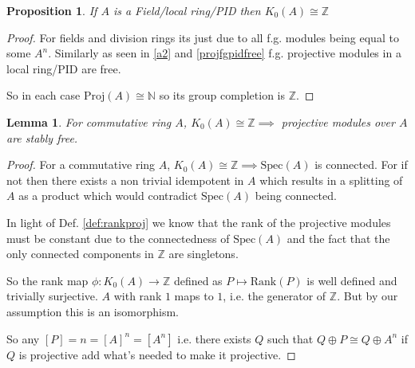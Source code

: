 \documentclass[12pt]{article}
\numberwithin{equation}{section}
\newcommand{\Z}{\mathbb{Z}}
\newcommand{\N}{\mathbb{N}}
\newcounter{dummy} \numberwithin{dummy}{section}
\newtheorem{definition}[dummy]{Definition}
\newtheorem{lemma}[dummy]{Lemma}
\newtheorem{proposition}[dummy]{Proposition}
\begin{document}
%	
	\begin{proposition}\label{k0pidisZ}
	If $A$ is a Field/local ring/PID then $K_0(A)\cong\Z$
	\end{proposition}
	\begin{proof}
		For fields and division rings its just due to all f.g. modules being equal to some $A^n$. Similarly as seen in \ref{a2} and \ref{projfgpidfree} f.g. projective modules in a local ring/PID are free.
		
		So in each case $\mathrm{Proj}(A) \cong \N$ so its group completion is $\Z.$
		\end{proof}
		
	\begin{lemma} For commutative ring $A$, 
		$K_0(A) \cong \Z \implies $ projective modules over $A$ are stably free.
	\end{lemma}
	\begin{proof}
		For a commutative ring $A$, $K_0(A) \cong \Z \implies \mathrm{Spec}(A)$ is connected. For if not then there exists a non trivial idempotent in $A$ which results in a splitting of $A$ as a product which would contradict $\mathrm{Spec}(A)$ being connected.
		
		In light of Def. \ref{def:rankproj} we know that the rank of the projective modules must be constant due to the connectedness of $\mathrm{Spec}(A)$ and the fact that the only connected components in $\Z $ are singletons. 
		
		So the rank map $\phi:K_0(A) \to \Z $ defined as $P \mapsto \mathrm{Rank}(P)$ is well defined and trivially surjective. $A$ with rank $1$ maps to $1$, i.e. the generator of $\Z$. But by our assumption this is an isomorphism.				
		
		So any $[P]=n=[A]^n=[A^n]$ i.e. there exists $Q$ such that $Q\oplus P \cong Q \oplus A^n$ if $Q$ is projective add what's needed to make it projective.
	\end{proof}
	
\end{document}
